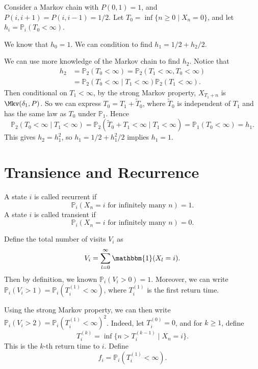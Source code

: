 \documentclass[12pt]{article}
\begin{document}
\begin{exbox}
	Consider a Markov chain with $P(0, 1) = 1$, and $P(i, i+1) = P(i, i-1) = 1/2$. Let $T_0 = \inf\{n \geq 0 \mid X_n = 0\}$, and let $h_i = \mathbb{P}_i(T_0 < \infty)$.

	We know that $h_0 = 1$. We can condition to find $h_1 = 1/2 + h_2/2$.

	We can use more knowledge of the Markov chain to find $h_2$. Notice that
	\begin{align*}
		h_2 &= \mathbb{P}_2(T_0 < \infty) = \mathbb{P}_2(T_1 < \infty, T_0 < \infty) \\
		    &= \mathbb{P}_2(T_0 < \infty \mid T_1 < \infty) \mathbb{P}_2(T_1 < \infty).
	\end{align*}
	Then conditional on $T_1 < \infty$, by the strong Markov property, $X_{T_1 + n}$ is $\Mkv(\delta_1, P)$. So we can express $T_0 = T_1 + \tilde T_0$, where $\tilde T_0$ is independent of $T_1$ and has the same law as $T_0$ under $\mathbb{P}_1$. Hence
	\[
		\mathbb{P}_2(T_0 < \infty \mid T_1 < \infty) = \mathbb{P}_2(\tilde T_0 + T_1 < \infty \mid T_1 < \infty) = \mathbb{P}_1(T_0 < \infty) = h_1
	.\]
	This gives $h_2 = h_1^2$, so $h_1 = 1/2 +h_1^2/2$ implies $h_1 = 1$.
\end{exbox}

\newpage

\section{Transience and Recurrence}%
\label{sec:transience_and_recurrence}

\begin{definition}
	A state $i$ is called recurrent if
	\[
		\mathbb{P}_i(X_n = i \text{ for infinitely many } n) = 1
	.\]
	A state $i$ is called transient if
	\[
		\mathbb{P}_i(X_n = i \text{ for infinitely many } n) = 0
	.\]
\end{definition}

Define the total number of visits $V_i$ as
\[
	V_i = \sum_{l = 0}^{\infty} \mathbbm{1}(X_l = i)
.\]
Then by definition, we known $\mathbb{P}_i(V_i > 0) = 1$. Moreover, we can write $\mathbb{P}_i(V_i > 1) = \mathbb{P}_i(T_i^{(1)} < \infty)$, where $T_i^{(1)}$ is the first return time.

Using the strong Markov property, we can then write $\mathbb{P}_i(V_i > 2) = \mathbb{P}_i(T_i^{(1)} < \infty)^2$. Indeed, let $T_i^{(0)} = 0$, and for $k \geq 1$, define 
\[
	T_i^{(k)} = \inf\{n > T_i^{(k-1)} \mid X_n = i\}
.\]
This is the $k$-th return time to $i$. Define
\[
	f_i = \mathbb{P}_i(T_i^{(1)} < \infty)
.\]
\end{document}
